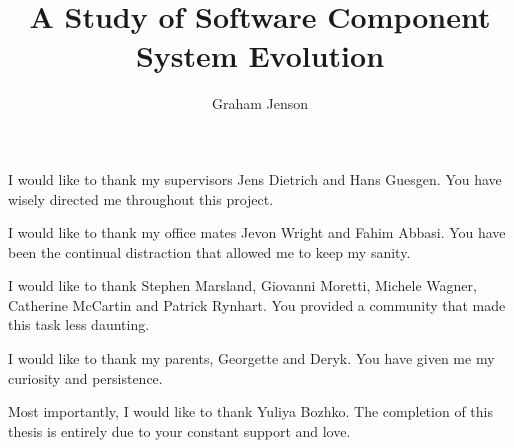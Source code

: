 \documentclass[11pt,PhD,twoside,openright]{muthesis}
\begin{document}




\title{A Study of Software Component System Evolution}
\author{Graham Jenson}

\beforeabstract

 


\newpage
\cleardoublepage
 
I would like to thank my supervisors Jens Dietrich and Hans Guesgen.
You have wisely directed me throughout this project.

I would like to thank my office mates Jevon Wright and Fahim Abbasi.
You have been the continual distraction that allowed me to keep my sanity.

I would like to thank Stephen Marsland, Giovanni Moretti, Michele Wagner, Catherine McCartin and Patrick Rynhart.
You provided a community that made this task less daunting. 

I would like to thank my parents, Georgette and Deryk.
You have given me my curiosity and persistence.

Most importantly, I would like to thank Yuliya Bozhko.
The completion of this thesis is entirely due to your constant support and love.

\newpage
\cleardoublepage

 
{}\tableofcontents
\newpage
\iftablespage
	\addvspace{10pt}
    \listoftables 
    \newpage
\fi
\iffigurespage
	\addvspace{10pt}
    \listoffigures
    \newpage
\fi

\afterpreface

\pagestyle{fancy}

\fancyhead{}
\fancyhead[LE,RO]{\slshape \leftmark}

\fancyfoot{} 
\fancyfoot[LE,RO]{\thepage} 
\renewcommand{\headrulewidth}{0.4pt}
\renewcommand{\footrulewidth}{0pt}






















\cleardoublepage
{} 
{}
  
{}
\end{document}
